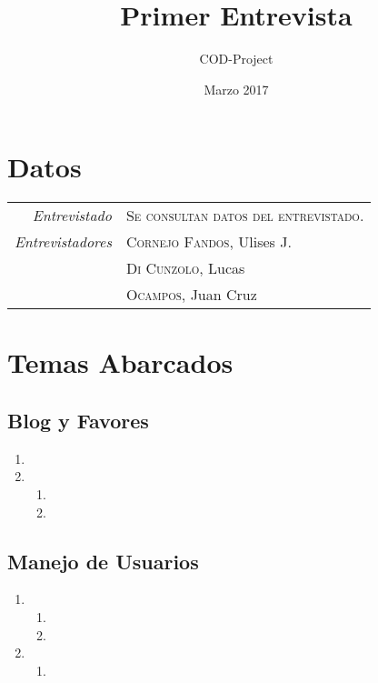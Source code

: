 \documentclass[a4paper,10pt]{article}
\title{Primer Entrevista}
\author{ COD-Project }
\date{Marzo 2017}
\begin{document}


\section{Datos}
\begin{tabular}{rl}
    \emph{Entrevistado} & \textsc{Se consultan datos del entrevistado.} \\
    \emph{Entrevistadores} & \textsc{Cornejo Fandos}, Ulises J. \\
    & \textsc{Di Cunzolo}, Lucas \\
    & \textsc{Ocampos}, Juan Cruz
\end{tabular}


\section{Temas Abarcados}
\subsection{Blog y Favores}
\begin{enumerate}
    \item 
    \item 
    \begin{enumerate}
        \item 
        \item 
    \end{enumerate}
\end{enumerate}

\subsection{Manejo de Usuarios}
\begin{enumerate}
    \item
    \begin{enumerate}
        \item 
        \item 
    \end{enumerate}
    \item \hspace{1cm}
    \begin{enumerate}
        \item
    \end{enumerate}
\end{enumerate}
\end{document}

